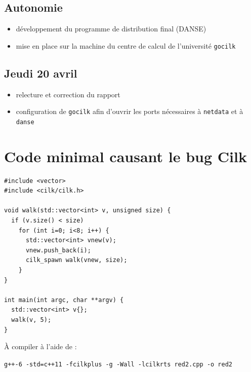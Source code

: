 \documentclass[12pt,a4paper]{report}
\begin{document}
\subsection*{Autonomie}
\begin{itemize}
	\item	développement du programme de distribution final (DANSE)
	\item	mise en place sur la machine du centre de calcul de l'université \texttt{gocilk}
\end{itemize}

\subsection*{Jeudi 20 avril}
\begin{itemize}
	\item	relecture et correction du rapport
	\item	configuration de \texttt{gocilk} afin d'ouvrir les ports nécessaires à \texttt{netdata} et à \texttt{danse}
\end{itemize}

\newpage

\section{Code minimal causant le bug Cilk}
\label{anx:bugcilk}

\begin{verbatim}
#include <vector>
#include <cilk/cilk.h>

void walk(std::vector<int> v, unsigned size) {
  if (v.size() < size)
    for (int i=0; i<8; i++) {
      std::vector<int> vnew(v);
      vnew.push_back(i);
      cilk_spawn walk(vnew, size);
    }
}

int main(int argc, char **argv) {
  std::vector<int> v{};
  walk(v, 5);
}
\end{verbatim}

À compiler à l'aide de :

{\centering \texttt{g++-6 -std=c++11 -fcilkplus -g -Wall -lcilkrts red2.cpp -o red2}}
\end{document}
